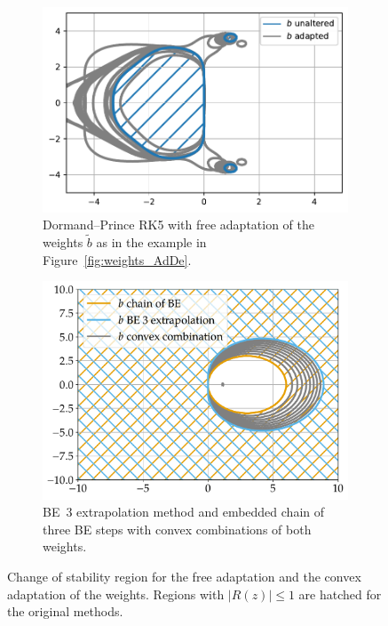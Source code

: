 \documentclass[a4paper]{article}
\numberwithin{equation}{section}
\theoremstyle{plain}
\theoremstyle{definition}
\numberwithin{theorem}{section}
\newcommand{\1}{\mathbbm{1}}
\newcommand{\bt}{\tilde{b}}
\begin{document}
\begin{figure}
     \centering
     \begin{subfigure}[b]{0.45\textwidth}
         \centering
         \includegraphics[width=\textwidth]{plots/stab_dp5.pdf}
         \caption{Dormand--Prince RK5 with free adaptation
                   of the weights $\bt$ as in the example in Figure~\ref{fig:weights_AdDe}.}
         \label{fig:stab_dp5}
     \end{subfigure}
     \hfill
     \begin{subfigure}[b]{0.45\textwidth}
         \centering
         \includegraphics[width=\textwidth]{plots/stab_ex3.pdf}
         \caption{BE~3 extrapolation method and embedded chain
                  of three BE steps with convex combinations of both
                  weights.}
         \label{fig:stab_ex3}
     \end{subfigure}
        \caption{Change of stability region for the free adaptation and
                 the convex adaptation of the weights.
                 Regions with $|R(z)| \leq 1$ are hatched for the original methods.}
        \label{fig:stab}
\end{figure}
\end{document}
